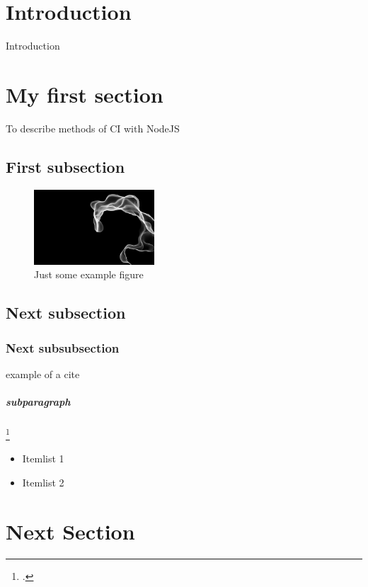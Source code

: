 \section{Introduction}
Introduction

\newpage

\section{My first section}
\label{section:Introduction}
To describe methods of CI with NodeJS

\subsection{First subsection}

\begin{figure}[h!]
  \centering
      \includegraphics[width=0.4\textwidth]{images/Perlin-Coherent.png}
  \caption{Just some example figure}
\end{figure}

\subsection{Next subsection}

\subsubsection{Next subsubsection}
 example of a cite \cite{meyer2014continuous}

\subparagraph{subparagraph}
\footcite{meyer2014continuous}

\begin{itemize}
  \item Itemlist 1
  \item Itemlist 2
\end{itemize} \cite{cranorplatform}

\section{Next Section}
\label{section:Label}

